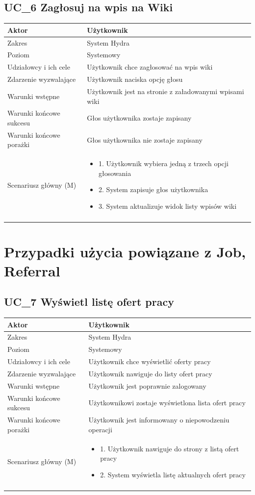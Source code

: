\documentclass[oneside]{scrreprt}
\newcommand\addheading[2]{#1 &#2\\ \hline}
\newcommand\tabularhead{\begin{center} \begin{tabular}{lp{8cm}}
		\hline
	}
\newcommand\addmulrow[2]{ \begin{minipage}[t][][t]{6cm}#1\end{minipage}%
		&\begin{minipage}[t][][t]{8cm}
			\begin{itemize} #2 \newline \end{itemize}
		\end{minipage}\\ \\  \hline}
\newenvironment{usecase}{\tabularhead}
	{\hline\end{tabular} \end{center}}
\begin{document}
\subsection{UC\_6 Zagłosuj na wpis na Wiki}
\begin{usecase}
	\addheading{Aktor}{Użytkownik} 
	\addheading{Zakres}{System Hydra}
	\addheading{Poziom}{Systemowy}
	\addheading{Udziałowcy i ich cele}{Użytkownik chce zagłosować na wpis wiki}
	\addheading{Zdarzenie wyzwalające}{Użytkownik naciska opcję głosu}
	\addheading{Warunki wstępne}{Użytkownik jest na stronie z załadowanymi wpisami wiki}
	\addheading{Warunki końcowe sukcesu}{Głos użytkownika zostaje zapisany}
	\addheading{Warunki końcowe porażki}{Głos użytkownika nie zostaje zapisany}
	\addmulrow{Scenariusz główny (M)}{
		\item[] 1. Użytkownik wybiera jedną z trzech opcji głosowania
		\item[] 2. System zapisuje głos użytkownika
		\item[] 3. System aktualizuje widok listy wpisów wiki
	}
\end{usecase}

\section{Przypadki użycia powiązane z Job, Referral}
\subsection{UC\_7 Wyświetl listę ofert pracy}
\begin{usecase}
	\addheading{Aktor}{Użytkownik} 
	\addheading{Zakres}{System Hydra}
	\addheading{Poziom}{Systemowy}
	\addheading{Udziałowcy i ich cele}{Użytkownik chce wyświetlić oferty pracy}
	\addheading{Zdarzenie wyzwalające}{Użytkownik nawiguje do listy ofert pracy}
	\addheading{Warunki wstępne}{Użytkownik jest poprawnie zalogowany}
	\addheading{Warunki końcowe sukcesu}{Użytkownikowi zostaje wyświetlona lista ofert pracy}
	\addheading{Warunki końcowe porażki}{Użytkownik jest informowany o niepowodzeniu operacji}
	\addmulrow{Scenariusz główny (M)}{
		\item[] 1. Użytkownik nawiguje do strony z listą ofert pracy
		\item[] 2. System wyświetla listę aktualnych ofert pracy
	}
\end{usecase}
\end{document}
